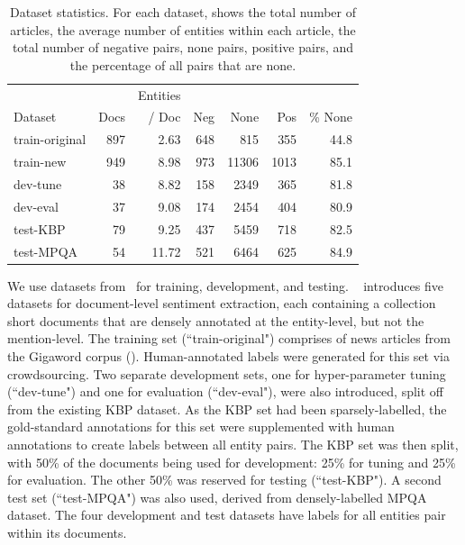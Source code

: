 \documentclass[11pt,a4paper]{article}
\begin{document}
\begin{table}[!t]
\centering
\begin{tabular}{| l | r | r | r | r | r | r |}
\hline
 & & Entities & & & & \\
Dataset & Docs & / Doc & Neg & None & Pos & \% None \\ \hline \hline
train-original & 897 & 2.63 & 648 & 815 & 355 & 44.8 \\
train-new & 949	 & 8.98 & 973 & 11306 & 1013 & 85.1 \\
dev-tune & 38 & 8.82 & 158 & 2349 & 365 & 81.8 \\
dev-eval& 37 & 9.08 & 174 & 2454 & 404 & 80.9 \\
test-KBP & 79 & 9.25 & 437 & 5459 & 718 & 82.5 \\
test-MPQA & 54 & 11.72 & 521 & 6464 & 625 & 84.9 \\
\hline
\end{tabular}
\caption{\label{tab:data} Dataset statistics. For each dataset, shows the total number of articles, the average number of entities within each article, the total number of negative pairs, none pairs, positive pairs, and the percentage of all pairs that are none.}
\end{table}

We use datasets from~ for training, development, and testing.
~ introduces five datasets for document-level sentiment extraction, each containing a collection short documents that are densely annotated at the entity-level, but not the mention-level.
The training set (``train-original") comprises of news articles from the Gigaword corpus ().
Human-annotated labels were generated for this set via crowdsourcing.
Two separate development sets, one for hyper-parameter tuning (``dev-tune") and one for evaluation (``dev-eval"), were also introduced, split off from the existing KBP dataset.
As the KBP set had been sparsely-labelled, the gold-standard annotations for this set were supplemented with human annotations to create labels between all entity pairs.
The KBP set was then split, with 50\% of the documents being used for development: 25\% for tuning and 25\% for 
evaluation. The other 50\% was reserved for testing (``test-KBP").
A second test set (``test-MPQA") was also used, derived from densely-labelled MPQA dataset.
The four development and test datasets have labels for all entities pair within its documents.
\end{document}
